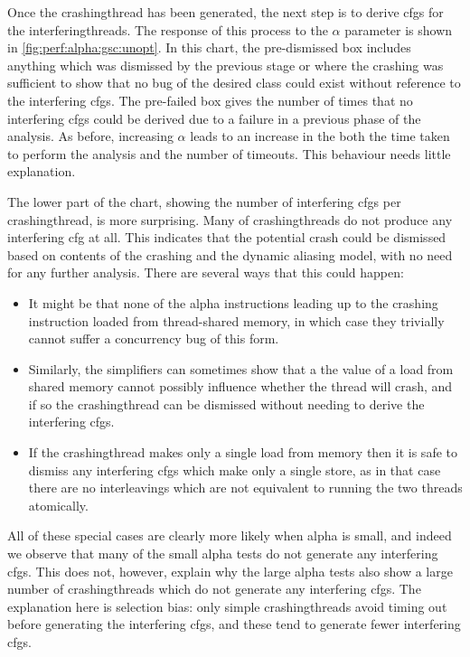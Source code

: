 Once the \gls{crashingthread} {\StateMachine} has been generated, the
next step is to derive \glspl{cfg} for the \glspl{interferingthread}.
The response of this process to the $\alpha$ parameter is shown in
\autoref{fig:perf:alpha:gsc:unopt}.  In this chart, the
pre-dismissed box includes anything which was dismissed by the
previous stage or where the crashing {\StateMachine} was sufficient to
show that no bug of the desired class could exist without reference to
the interfering \glspl{cfg}.  The pre-failed box gives the number of
times that no interfering \glspl{cfg} could be derived due to a
failure in a previous phase of the analysis.  As before, increasing
$\alpha$ leads to an increase in the both the time taken to perform
the analysis and the number of timeouts.  This behaviour needs little
explanation.

The lower part of the chart, showing the number of interfering
\glspl{cfg} per \gls{crashingthread}, is more surprising.  Many of
\glspl{crashingthread} do not produce any interfering \gls{cfg} at
all.  This indicates that the potential crash could be dismissed based
on contents of the crashing {\StateMachine} and the dynamic aliasing
model, with no need for any further analysis.  There are several ways
that this could happen:

\begin{itemize}
\item It might be that none of the \gls{alpha} instructions leading up
  to the crashing instruction loaded from thread-shared memory, in
  which case they trivially cannot suffer a concurrency bug of this
  form.
\item Similarly, the simplifiers can sometimes show that a the value
  of a load from shared memory cannot possibly influence whether the
  thread will crash, and if so the \gls{crashingthread} can be
  dismissed without needing to derive the interfering \glspl{cfg}.
\item If the \gls{crashingthread} makes only a single load from memory
  then it is safe to dismiss any interfering \glspl{cfg} which make
  only a single store, as in that case there are no interleavings
  which are not equivalent to running the two threads atomically.
\end{itemize}

All of these special cases are clearly more likely when \gls{alpha} is
small, and indeed we observe that many of the small \gls{alpha} tests
do not generate any interfering \glspl{cfg}.  This does not, however,
explain why the large \gls{alpha} tests also show a large number of
\glspl{crashingthread} which do not generate any interfering
\glspl{cfg}.  The explanation here is selection bias: only simple
\glspl{crashingthread} avoid timing out before generating the
interfering \glspl{cfg}, and these tend to generate fewer interfering
\glspl{cfg}.

